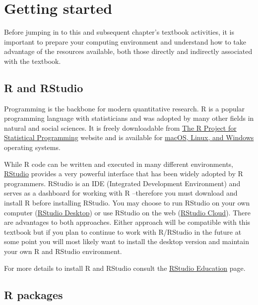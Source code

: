 \documentclass[
  letterpaper,
]{latex/krantz}
\begin{document}
\hypertarget{getting-started}{%
\section*{Getting started}\label{getting-started}}

Before jumping in to this and subsequent chapter's textbook activities,
it is important to prepare your computing environment and understand how
to take advantage of the resources available, both those directly and
indirectly associated with the textbook.

\hypertarget{r-and-rstudio}{%
\subsection*{R and RStudio}\label{r-and-rstudio}}

Programming is the backbone for modern quantitative research. R is a
popular programming language with statisticians and was adopted by many
other fields in natural and social sciences. It is freely downloadable
from \href{https://www.r-project.org/}{The R Project for Statistical
Programming} website and is available for
\href{https://cloud.r-project.org/}{macOS, Linux, and Windows} operating
systems.

While R code can be written and executed in many different environments,
\href{https://www.rstudio.com/products/rstudio/}{RStudio} provides a
very powerful interface that has been widely adopted by R programmers.
RStudio is an IDE (Integrated Development Environment) and serves as a
dashboard for working with R --therefore you must download and install R
before installing RStudio. You may choose to run RStudio on your own
computer (\href{https://www.rstudio.com/products/rstudio/}{RStudio
Desktop}) or use RStudio on the web
(\href{https://www.rstudio.com/products/cloud/}{RStudio Cloud}). There
are advantages to both approaches. Either approach will be compatible
with this textbook but if you plan to continue to work with R/RStudio in
the future at some point you will most likely want to install the
desktop version and maintain your own R and RStudio environment.

For more details to install R and RStudio consult the
\href{https://education.rstudio.com/learn/beginner/}{RStudio Education}
page.

\hypertarget{r-packages}{%
\subsection*{R packages}\label{r-packages}}
\end{document}
